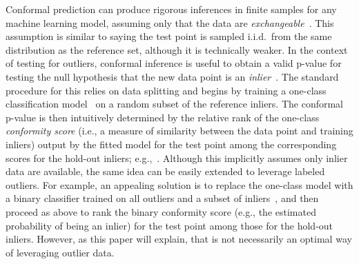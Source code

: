 \documentclass[11pt]{article}
\begin{document}

Conformal prediction can produce rigorous inferences in finite samples for any machine learning model, assuming only that the data are {\em exchangeable}~\cite{vovk1999machine,vovk2005algorithmic}. 
This assumption is similar to saying the test point is sampled i.i.d.~from the same distribution as the reference set, although it is technically weaker.
In the context of testing for outliers, conformal inference is useful to obtain a valid p-value for testing the null hypothesis that the new data point is an {\em inlier}~\cite{bates2021testing,haroush2021statistical}.
The standard procedure for this relies on data splitting and begins by training a one-class classification model~\cite{moya1993one,khan2014one,pimentel2014review,sabokrou2018adversarially} on a random subset of the reference inliers. The conformal p-value is then intuitively determined by the relative rank of the one-class {\em conformity score} (i.e., a measure of similarity between the data point and training inliers) output by the fitted model for the test point among the corresponding scores for the hold-out inliers; e.g.,~\cite{bates2021testing}. 
Although this implicitly assumes only inlier data are available, the same idea can be easily extended to leverage labeled outliers. For example, an appealing solution is to replace the one-class model with a binary classifier trained on all outliers and a subset of inliers~\cite{vovk2003mondrian,haroush2021statistical}, and then proceed as above to rank the binary conformity score (e.g., the estimated probability of being an inlier) for the test point among those for the hold-out inliers.
However, as this paper will explain, that is not necessarily an optimal way of leveraging outlier data.
\end{document}

